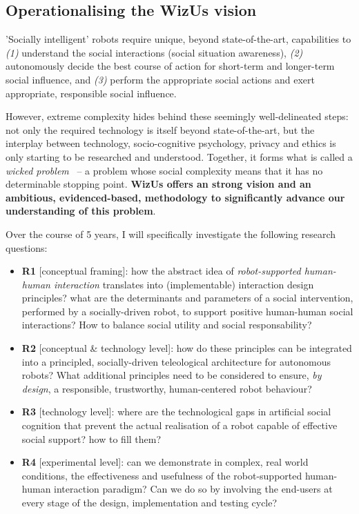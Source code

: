 \documentclass[11pt]{report}
\newcommand{\project}{WizUs\xspace}
\begin{document}
\subsection{Operationalising the \project vision}

'Socially intelligent' robots require unique, beyond state-of-the-art,
capabilities to \emph{(1)} understand the social interactions (social
situation awareness), \emph{(2)} autonomously decide the best course of action for
short-term and longer-term social influence, and \emph{(3)} perform the
appropriate social actions and exert appropriate, responsible social influence.

However, extreme complexity hides behind these seemingly well-delineated steps:
not only the required technology is itself beyond state-of-the-art, but the
interplay between technology, socio-cognitive psychology, privacy and ethics is
only starting to be researched and understood. Together, it forms what is called
a \emph{wicked problem}~\cite{tonkinwise2015design} -- a problem whose social complexity
means that it has no determinable stopping point. \textbf{\project offers an
strong vision and an ambitious, evidenced-based, methodology to significantly
advance our understanding of this problem}.

Over the course of 5 years, I will specifically investigate the following
research questions:

\begin{itemize}
    \item \textbf{R1} [conceptual framing]: how the abstract idea of
        \emph{robot-supported human-human interaction} translates into
        (implementable) interaction design principles? what are the determinants
        and parameters of a social intervention, performed by a socially-driven
        robot, to support positive human-human social interactions? How to
        balance social utility and social responsability?

    \item \textbf{R2} [conceptual \& technology level]: how do these principles
        can be integrated into a principled, socially-driven teleological
        architecture for autonomous robots? What additional principles need to
        be considered to ensure, \emph{by design}, a responsible, trustworthy,
        human-centered robot behaviour?

    \item \textbf{R3} [technology level]: where are the technological gaps in
        artificial social cognition that prevent the actual realisation of a
        robot capable of effective social support? how to fill them?

    \item \textbf{R4} [experimental level]: can we demonstrate in complex, real
        world conditions, the effectiveness and usefulness of the
        robot-supported human-human interaction paradigm? Can we do so by
        involving the end-users at every stage of the design, implementation and
        testing cycle?

\end{itemize}
\end{document}
